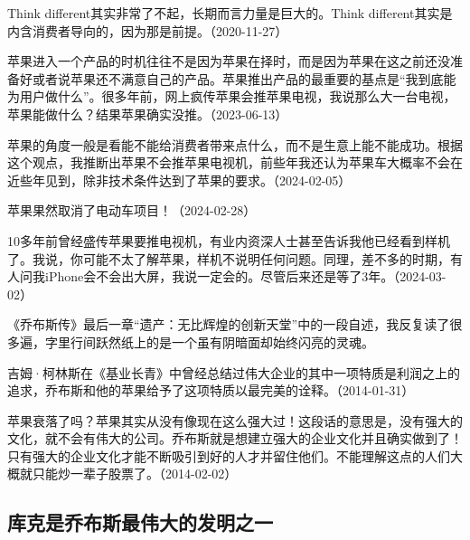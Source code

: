 
Think different其实非常了不起，长期而言力量是巨大的。Think different其实是内含消费者导向的，因为那是前提。（2020-11-27）

苹果进入一个产品的时机往往不是因为苹果在择时，而是因为苹果在这之前还没准备好或者说苹果还不满意自己的产品。苹果推出产品的最重要的基点是“我到底能为用户做什么”。很多年前，网上疯传苹果会推苹果电视，我说那么大一台电视，苹果能做什么？结果苹果确实没推。（2023-06-13）

苹果的角度一般是看能不能给消费者带来点什么，而不是生意上能不能成功。根据这个观点，我推断出苹果不会推苹果电视机，前些年我还认为苹果车大概率不会在近些年见到，除非技术条件达到了苹果的要求。（2024-02-05）

苹果果然取消了电动车项目！（2024-02-28）


10多年前曾经盛传苹果要推电视机，有业内资深人士甚至告诉我他已经看到样机了。我说，你可能不太了解苹果，样机不说明任何问题。同理，差不多的时期，有人问我iPhone会不会出大屏，我说一定会的。尽管后来还是等了3年。（2024-03-02）

《乔布斯传》最后一章“遗产：无比辉煌的创新天堂”中的一段自述，我反复读了很多遍，字里行间跃然纸上的是一个虽有阴暗面却始终闪亮的灵魂。

吉姆·柯林斯在《基业长青》中曾经总结过伟大企业的其中一项特质是利润之上的追求，乔布斯和他的苹果给予了这项特质以最完美的诠释。（2014-01-31）


苹果衰落了吗？苹果其实从没有像现在这么强大过！这段话的意思是，没有强大的文化，就不会有伟大的公司。乔布斯就是想建立强大的企业文化并且确实做到了！只有强大的企业文化才能不断吸引到好的人才并留住他们。不能理解这点的人们大概就只能炒一辈子股票了。（2014-02-02）

\subsection{库克是乔布斯最伟大的发明之一}


